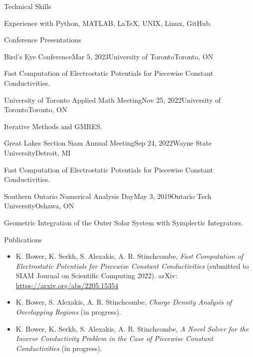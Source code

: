 \documentclass{resume}
\begin{document}
\begin{rSection}{Technical Skills}

{\normalfont Experience with Python, MATLAB, LaTeX, UNIX, Linux, GitHub.}

\end{rSection}

\begin{rSection}{Conference Presentations}

\begin{rSubsection}{Bird's Eye Conference}{Mar 5, 2023}{University of Toronto}{Toronto, ON}
\item Fast Computation of Electrostatic Potentials for Piecewise Constant Conductivities.
\end{rSubsection}

\begin{rSubsection}{University of Toronto Applied Math Meeting}{Nov 25, 2022}{University of Toronto}{Toronto, ON}
\item Iterative Methods and GMRES.
\end{rSubsection}

\begin{rSubsection}{Great Lakes Section Siam Annual Meeting}{Sep 24, 2022}{Wayne State University}{Detroit, MI}
\item Fast Computation of Electrostatic Potentials for Piecewise Constant Conductivities.
\end{rSubsection}

\begin{rSubsection}{Southern Ontario Numerical Analysis Day}{May 3, 2019}{Ontario Tech University}{Oshawa, ON}
\item Geometric Integration of the Outer Solar System with Symplectic Integrators.
\end{rSubsection}

\end{rSection}

\begin{rSection}{Publications}
    \begin{itemize}
        \item K. Bower, K. Serkh, S. Alexakis, A. R. Stinchcombe, \textit{Fast Computation of Electrostatic Potentials for Piecewise Constant Conductivities} (submitted to SIAM Journal on Scientific Computing 2022). arXiv: \url{https://arxiv.org/abs/2205.15354}
        \item K. Bower, S. Alexakis, A. R. Stinchcombe, \textit{Charge Density Analysis of Overlapping Regions} (in progress).
        \item K. Bower, K. Serkh, S. Alexakis, A. R. Stinchcombe, \textit{A Novel Solver for the Inverse Conductivity Problem in the Case of Piecewise Constant Conductivities} (in progress).
    \end{itemize}
\end{rSection}
\end{document}
